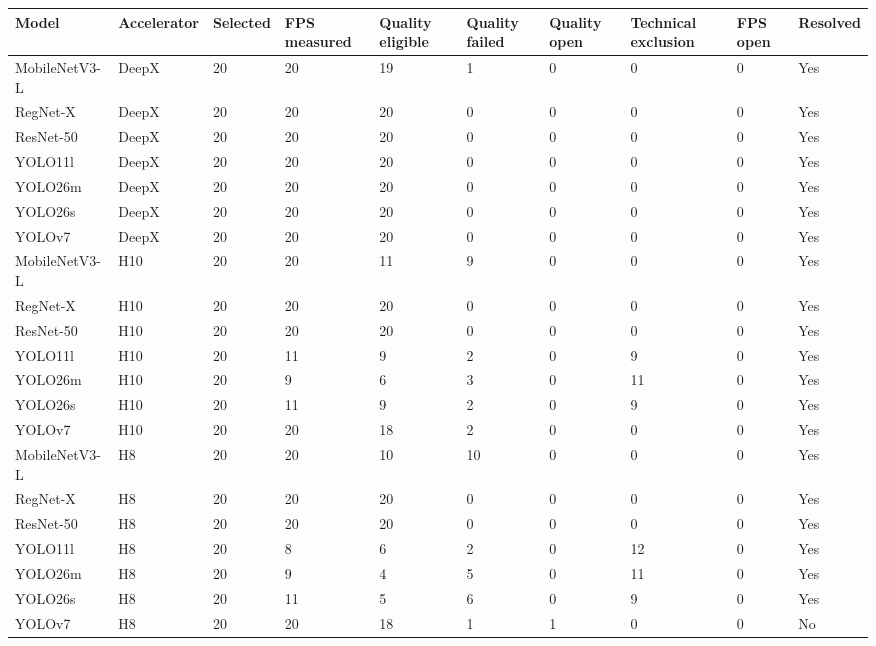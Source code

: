 \begin{tabular}{@{}llllllllll@{}}
\toprule
Model & Accelerator & Selected & FPS measured & Quality eligible & Quality failed & Quality open & Technical exclusion & FPS open & Resolved \\
\midrule
MobileNetV3-L & DeepX & 20 & 20 & 19 & 1 & 0 & 0 & 0 & Yes \\
RegNet-X & DeepX & 20 & 20 & 20 & 0 & 0 & 0 & 0 & Yes \\
ResNet-50 & DeepX & 20 & 20 & 20 & 0 & 0 & 0 & 0 & Yes \\
YOLO11l & DeepX & 20 & 20 & 20 & 0 & 0 & 0 & 0 & Yes \\
YOLO26m & DeepX & 20 & 20 & 20 & 0 & 0 & 0 & 0 & Yes \\
YOLO26s & DeepX & 20 & 20 & 20 & 0 & 0 & 0 & 0 & Yes \\
YOLOv7 & DeepX & 20 & 20 & 20 & 0 & 0 & 0 & 0 & Yes \\
MobileNetV3-L & H10 & 20 & 20 & 11 & 9 & 0 & 0 & 0 & Yes \\
RegNet-X & H10 & 20 & 20 & 20 & 0 & 0 & 0 & 0 & Yes \\
ResNet-50 & H10 & 20 & 20 & 20 & 0 & 0 & 0 & 0 & Yes \\
YOLO11l & H10 & 20 & 11 & 9 & 2 & 0 & 9 & 0 & Yes \\
YOLO26m & H10 & 20 & 9 & 6 & 3 & 0 & 11 & 0 & Yes \\
YOLO26s & H10 & 20 & 11 & 9 & 2 & 0 & 9 & 0 & Yes \\
YOLOv7 & H10 & 20 & 20 & 18 & 2 & 0 & 0 & 0 & Yes \\
MobileNetV3-L & H8 & 20 & 20 & 10 & 10 & 0 & 0 & 0 & Yes \\
RegNet-X & H8 & 20 & 20 & 20 & 0 & 0 & 0 & 0 & Yes \\
ResNet-50 & H8 & 20 & 20 & 20 & 0 & 0 & 0 & 0 & Yes \\
YOLO11l & H8 & 20 & 8 & 6 & 2 & 0 & 12 & 0 & Yes \\
YOLO26m & H8 & 20 & 9 & 4 & 5 & 0 & 11 & 0 & Yes \\
YOLO26s & H8 & 20 & 11 & 5 & 6 & 0 & 9 & 0 & Yes \\
YOLOv7 & H8 & 20 & 20 & 18 & 1 & 1 & 0 & 0 & No \\
\bottomrule
\end{tabular}
